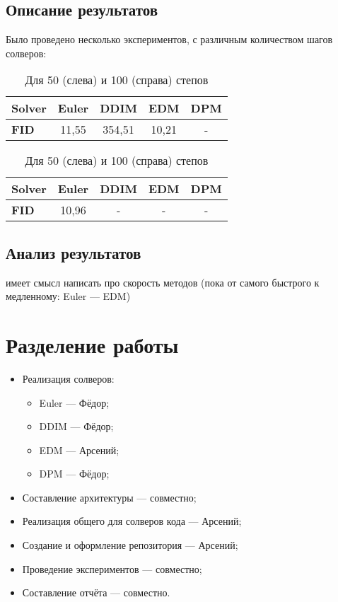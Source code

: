 \documentclass[a4paper]{article}
\begin{document}
    \subsection{Описание результатов}
    Было проведено несколько экспериментов, с различным количеством шагов солверов:
    \begin{table}
        \begin{tabular}{ l | c | c | c | c }
            \textbf{Solver} & Euler & DDIM  & EDM   & DPM \\ \hline
            \textbf{FID}    & 11{,}55 & 354{,}51     & 10{,}21   & -
        \end{tabular}\hspace{50pt}%
        \begin{tabular}{ l | c | c | c | c }
            \textbf{Solver} & Euler & DDIM  & EDM   & DPM \\ \hline
            \textbf{FID}    & 10{,}96     & -     &   -   & -
        \end{tabular}
        \caption{Для 50 (слева) и 100 (справа) степов}
    \end{table}

    \subsection{Анализ результатов}
    
    имеет смысл написать про скорость методов (пока от самого быстрого к медленному:
    Euler --- EDM)


    \section{Разделение работы}
    \begin{itemize}
        \item Реализация солверов:
            \begin{itemize}
                \item Euler --- Фёдор;
                \item DDIM --- Фёдор;
                \item EDM --- Арсений;
                \item DPM --- Фёдор;
            \end{itemize}
        \item Составление архитектуры --- совместно;
        \item Реализация общего для солверов кода --- Арсений;
        \item Создание и оформление репозитория --- Арсений;
        \item Проведение экспериментов --- совместно;
        \item Составление отчёта --- совместно.
    \end{itemize}
\end{document}
